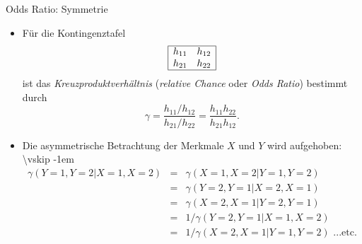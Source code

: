 \documentclass[
  10pt,
  ignorenonframetext,
]{beamer}
\providecommand{\tightlist}{%
  \setlength{\itemsep}{0pt}\setlength{\parskip}{0pt}}
\begin{document}
\begin{frame}{Odds Ratio: Symmetrie}
\label{odds-ratio-symmetrie}
\begin{itemize}
\tightlist
\item
  Für die Kontingenztafel \begin{displaymath}
  \begin{array}{|cc|}\hline
  h_{11} & h_{12}\\
  h_{21} & h_{22}\\\hline
  \end{array}
  \end{displaymath} ist das \textit{Kreuzproduktverhältnis}
  (\textit{relative Chance} oder \textit{Odds
  Ratio}) bestimmt durch \begin{displaymath}
  \gamma = \frac{h_{11}/h_{12}}{h_{21}/h_{22}} = \frac{h_{11}
  h_{22}}{h_{21}h_{12}}.
  \end{displaymath}
\item
  Die asymmetrische Betrachtung der Merkmale \(X\) und \(Y\) wird
  aufgehoben: \textbackslash vskip -1em \begin{align*}
  \gamma(Y=1,Y=2|X=1,X=2) &=& \gamma(X=1,X=2|Y=1,Y=2)\\
                       &=& \gamma(Y=2,Y=1|X=2,X=1)\\
                       &=& \gamma(X=2,X=1|Y=2,Y=1)\\
                       &=& 1/\gamma(Y=2, Y=1|X = 1, X=2)\\
                       &=& 1/\gamma(X=2, X=1|Y = 1, Y=2)\text{ ...etc.}\\
  \end{align*}
\end{itemize}
\end{frame}
\end{document}
